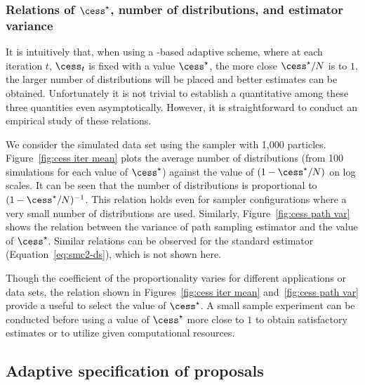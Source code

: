 \subsubsection[Relations of cess*, number of distributions, and estimator variance]{Relations of $\cess^\star$, number of distributions, and estimator variance}
\label{ssub:Relations of cess*, number of distributions, and estimator variance}

It is intuitively  that, when using a \cess-based adaptive scheme, where at each iteration $t$, $\cess_t$ is fixed with a value $\cess^\star$, the more close $\cess^\star/N$ is to $1$, the larger  number of distributions  will be placed and better estimates can be obtained. Unfortunately it is not trivial to establish a quantitative  among these three quantities even asymptotically. However, it is straightforward to conduct an empirical study of these relations.

We consider the simulated \pet data set using the \smc[2] sampler with 1,000 particles. Figure~\ref{fig:cess iter mean} plots the average number of distributions (from 100 simulations for each value of $\cess^\star$) against the value of $(1 - \cess^\star/N)$ on log scales. It can be seen that the number of distributions is proportional to $(1 - \cess^\star/N)^{-1}$. This relation holds even for sampler configurations where a very small number of distributions are used. Similarly, Figure~\ref{fig:cess path var} shows the relation between the variance of path sampling estimator and the value of $\cess^\star$. Similar relations can be observed for the standard estimator (Equation~\eqref{eq:smc2-ds}), which is not shown here.




Though the coefficient of the proportionality varies for different applications or data sets, the relation shown in Figures~\ref{fig:cess iter mean} and~\ref{fig:cess path var} provide a useful  to select the value of $\cess^\star$. A small sample experiment can be conducted before using a value of $\cess^\star$ more close to $1$ to obtain satisfactory estimates or to utilize given computational resources.

\subsection{Adaptive specification of proposals}
\label{sub:Adaptive specification of proposals}

